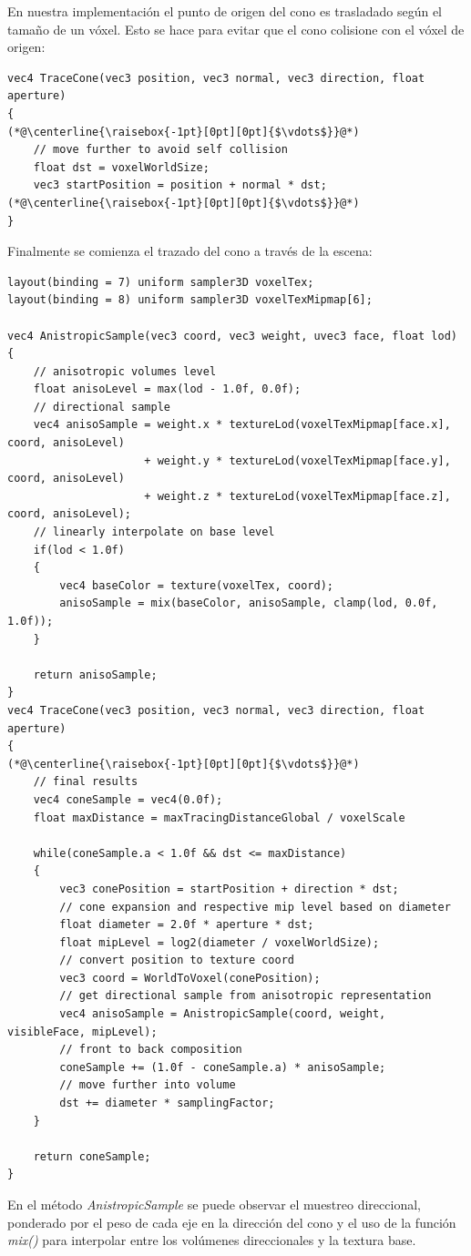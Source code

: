En nuestra implementación el punto de origen del cono es trasladado según el tamaño de un vóxel. Esto se hace para evitar que el cono colisione con el vóxel de origen:
\\
\begin{lstlisting}[caption={Traslado de origen del cono.}, label=Trace1]
vec4 TraceCone(vec3 position, vec3 normal, vec3 direction, float aperture)
{
(*@\centerline{\raisebox{-1pt}[0pt][0pt]{$\vdots$}}@*)
	// move further to avoid self collision
	float dst = voxelWorldSize;
	vec3 startPosition = position + normal * dst;
(*@\centerline{\raisebox{-1pt}[0pt][0pt]{$\vdots$}}@*)
}
\end{lstlisting}
Finalmente se comienza el trazado del cono a través de la escena:
\\
\begin{lstlisting}[caption={Trazado de cono con voxeles.}, label=Trace2]
layout(binding = 7) uniform sampler3D voxelTex;
layout(binding = 8) uniform sampler3D voxelTexMipmap[6];

vec4 AnistropicSample(vec3 coord, vec3 weight, uvec3 face, float lod)
{
    // anisotropic volumes level
    float anisoLevel = max(lod - 1.0f, 0.0f);
    // directional sample
    vec4 anisoSample = weight.x * textureLod(voxelTexMipmap[face.x], coord, anisoLevel)
                     + weight.y * textureLod(voxelTexMipmap[face.y], coord, anisoLevel)
                     + weight.z * textureLod(voxelTexMipmap[face.z], coord, anisoLevel);
    // linearly interpolate on base level
    if(lod < 1.0f)
    {
        vec4 baseColor = texture(voxelTex, coord);
        anisoSample = mix(baseColor, anisoSample, clamp(lod, 0.0f, 1.0f));
    }

    return anisoSample;                    
}
vec4 TraceCone(vec3 position, vec3 normal, vec3 direction, float aperture)
{
(*@\centerline{\raisebox{-1pt}[0pt][0pt]{$\vdots$}}@*)
    // final results
    vec4 coneSample = vec4(0.0f);
    float maxDistance = maxTracingDistanceGlobal / voxelScale

    while(coneSample.a < 1.0f && dst <= maxDistance)
    {
        vec3 conePosition = startPosition + direction * dst;
        // cone expansion and respective mip level based on diameter
        float diameter = 2.0f * aperture * dst;
        float mipLevel = log2(diameter / voxelWorldSize);
        // convert position to texture coord
        vec3 coord = WorldToVoxel(conePosition);
        // get directional sample from anisotropic representation
        vec4 anisoSample = AnistropicSample(coord, weight, visibleFace, mipLevel);
        // front to back composition
        coneSample += (1.0f - coneSample.a) * anisoSample;
        // move further into volume
        dst += diameter * samplingFactor;
    }

    return coneSample;
}
\end{lstlisting}
En el método \emph{AnistropicSample} se puede observar el muestreo direccional, ponderado por el peso de cada eje en la dirección del cono y el uso de la función \emph{mix()} para interpolar entre los volúmenes direccionales y la textura base. 

